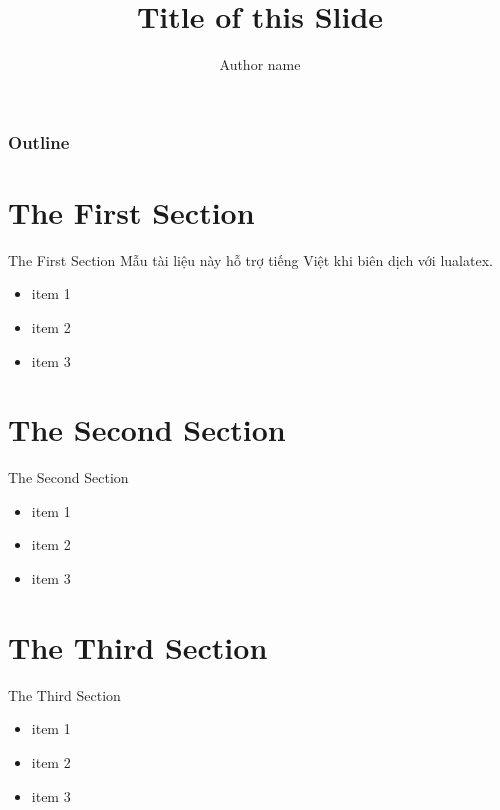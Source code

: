 \documentclass[pdf]{beamer}
\title{Title of this Slide}
\author{Author name}
\begin{document}
	\begin{frame}
	    \titlepage
	\end{frame}

	\begin{frame}
	    \frametitle{Outline}
	    \tableofcontents
	\end{frame}


	\section{The First Section}
	\begin{frame}{The First Section}
		Mẫu tài liệu này hỗ trợ tiếng Việt khi biên dịch với lualatex.

		\begin{itemize}
		\item item 1
		\item item 2
		\item item 3
		\end{itemize}
	\end{frame}

	\section{The Second Section}
	\begin{frame}{The Second Section}
		\begin{itemize}
		\item item 1
		\item item 2
		\item item 3
		\end{itemize}
	\end{frame}

	\section{The Third Section}
	\begin{frame}{The Third Section}
		\begin{itemize}
		\item item 1
		\item item 2
		\item item 3
		\end{itemize}
	\end{frame}
\end{document}
